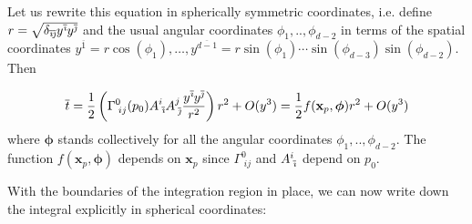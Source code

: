 \documentclass[12pt]{article}
\newcommand{\be}{\begin{equation}}
\newcommand{\ee}{\end{equation}}
\newcommand{\ibar}{{\overline{\emph\i}}}
\newcommand{\jbar}{{\overline{\emph\j}}}
\begin{document}
Let us rewrite this equation in spherically symmetric coordinates, i.e. define $r=\sqrt{\delta_{\ibar\jbar}y^\ibar y^\jbar}$ and the usual angular coordinates $\phi_1,..,\phi_{d-2}$ in terms of the spatial coordinates $y^{\overline{1}} = r \cos(\phi_1),\ldots, y^{\overline{d-1}} = r \sin(\phi_1) \cdots \sin(\phi_{d-3}) \sin(\phi_{d-2})$. Then

\be\label{eq:RadialBottomSurface}
\overline{t}=\frac{1}{2}\left(\Gamma^{0}_{\;ij}(p_0)A^{i}_{\;\ibar}A^{j}_{\;\jbar}\frac{y^{\ibar} y^{\jbar}}{r^2}\right)r^2+O(y^3)=\frac{1}{2}f(\mathbf{x}_p,{\boldsymbol\phi})r^2+O(y^3)
\ee
where $\boldsymbol\phi$ stands collectively for all the angular coordinates $\phi_1,..,\phi_{d-2}$. The function $f(\mathbf{x}_p,\boldsymbol\phi)$ depends on $\mathbf{x}_p$ since $\Gamma^{0}_{\;ij}$ and $A^{i}_{\;\ibar}$ depend on $p_0$.

With the boundaries of the integration region in place, we can now write down the integral explicitly in spherical coordinates:
\end{document}
